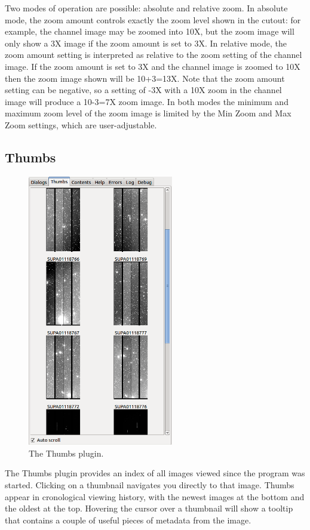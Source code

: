 \documentclass[11pt]{report}
\begin{document}
Two modes of operation are possible: absolute and relative zoom.  In
absolute mode, the zoom amount controls exactly the zoom level shown in
the cutout: for example, the channel image may be zoomed into 10X, but
the zoom image will only show a 3X image if the zoom amount is set to
3X.
In relative mode, the zoom amount setting is interpreted as relative to
the zoom setting of the channel image.  If the zoom amount is set to 3X
and the channel image is zoomed to 10X then the zoom image shown will be
10+3=13X.  Note that the zoom amount setting can be negative, so a
setting of -3X with a 10X zoom in the channel image will produce a
10-3=7X zoom image.
In both modes the minimum and maximum zoom level of the zoom image is
limited by the Min Zoom and Max Zoom settings, which are
user-adjustable.  

\newpage
\subsection{Thumbs}
\begin{figure}
  \includegraphics[width=2.5in]{thumbs-plugin.png}
  \caption[example] 
          { \label{fig:thumbs-plugin} 
            The Thumbs plugin.} 
\end{figure} 
The Thumbs plugin provides an index of all images viewed since the
program was started.  Clicking on a thumbnail navigates you directly to
that image.  Thumbs appear in cronological viewing history, with the
newest images at the bottom and the oldest at the top.  Hovering the
cursor over a thumbnail will show a tooltip that contains a couple of
useful pieces of metadata from the image.
\end{document}
